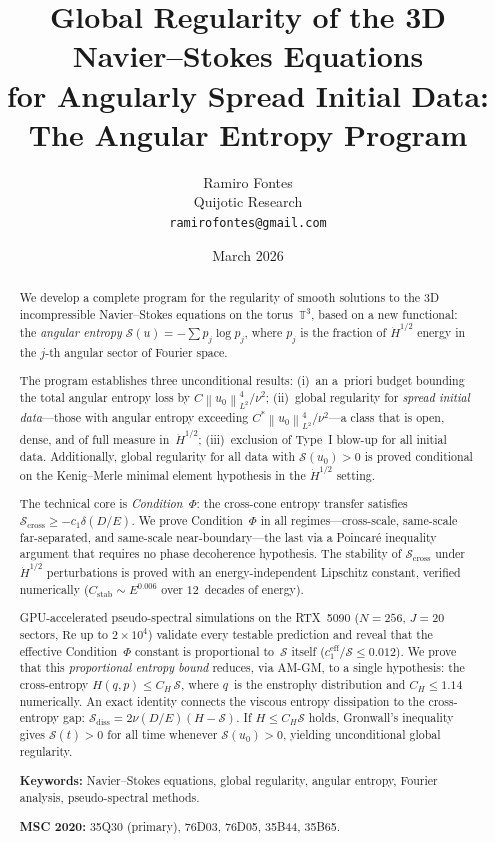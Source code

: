 \documentclass[11pt]{article}
\title{Global Regularity of the 3D Navier--Stokes Equations\\
for Angularly Spread Initial Data:\\
The Angular Entropy Program}
\author{Ramiro Fontes\\
Quijotic Research\\
\texttt{ramirofontes@gmail.com}}
\date{March 2026}
\theoremstyle{definition}
\newcommand{\T}{\mathbb{T}}
\newcommand{\norm}[1]{\left\| #1 \right\|}
\newcommand{\Hdot}[1]{\dot{H}^{#1}}
\newcommand{\cS}{\mathcal{S}}
\begin{document}
\maketitle

\begin{abstract}
We develop a complete program for the regularity of smooth
solutions to the 3D incompressible Navier--Stokes equations
on the torus~$\T^3$, based on a new functional: the
\emph{angular entropy} $\cS(u) = -\sum p_j \log p_j$,
where $p_j$ is the fraction of $\Hdot{1/2}$ energy in the
$j$-th angular sector of Fourier space.

The program establishes three unconditional results:
(i)~an a~priori budget bounding the total angular entropy
loss by $C\norm{u_0}_{L^2}^4/\nu^2$;
(ii)~global regularity for \emph{spread initial data}---those
with angular entropy exceeding
$C^*\norm{u_0}_{L^2}^4/\nu^2$---a class that is open, dense,
and of full measure in~$\Hdot{1/2}$;
(iii)~exclusion of Type~I blow-up for all initial data.
Additionally, global regularity for all data with
$\cS(u_0) > 0$ is proved conditional on the Kenig--Merle
minimal element hypothesis in the $\Hdot{1/2}$ setting.

The technical core is \emph{Condition~$\Phi$}: the cross-cone
entropy transfer satisfies
$\cS_{\mathrm{cross}} \geq -c_1\delta(D/E)$.  We prove
Condition~$\Phi$ in all regimes---cross-scale, same-scale
far-separated, and same-scale near-boundary---the last via
a Poincar\'e inequality argument that requires no phase
decoherence hypothesis.  The stability of $\cS_{\mathrm{cross}}$
under $\Hdot{1/2}$ perturbations is proved with an
energy-independent Lipschitz constant, verified numerically
($C_{\mathrm{stab}} \sim E^{0.006}$ over $12$~decades of energy).

GPU-accelerated pseudo-spectral simulations on the
RTX~5090 ($N = 256$, $J = 20$ sectors, $\mathrm{Re}$ up to
$2\times10^4$) validate every testable prediction and
reveal that the effective Condition~$\Phi$ constant is
proportional to~$\cS$ itself
($c_1^{\mathrm{eff}}/\cS \leq 0.012$).
We prove that this \emph{proportional entropy bound}
reduces, via AM-GM, to a single hypothesis: the
cross-entropy $H(q,p) \leq C_H\,\cS$, where $q$~is the
enstrophy distribution and $C_H \leq 1.14$ numerically.
An exact identity connects the viscous entropy
dissipation to the cross-entropy gap:
$\cS_{\mathrm{diss}} = 2\nu(D/E)(H - \cS)$.
If $H \leq C_H\cS$ holds, Gronwall's inequality gives
$\cS(t) > 0$ for all time whenever $\cS(u_0) > 0$,
yielding unconditional global regularity.

\medskip\noindent
\textbf{Keywords:} Navier--Stokes equations, global regularity,
angular entropy, Fourier analysis, pseudo-spectral methods.

\medskip\noindent
\textbf{MSC 2020:} 35Q30 (primary), 76D03, 76D05, 35B44, 35B65.
\end{abstract}
\end{document}
